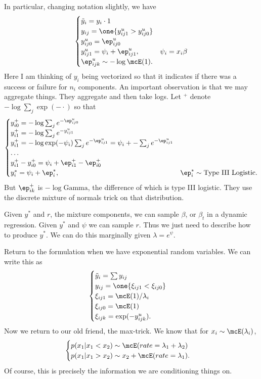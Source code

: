 \documentclass{article}
\begin{document}
In particular, changing notation slightly, we have
\[
\begin{cases}
\tilde y_i = y_i \cdot 1 \\
y_{ij} = \one \{ y_{ij1}^u > y_{ij0}^u \} \\
y_{ij0}^u = \ep_{ij0}^u \\
y_{ij1}^u = \psi_i + \ep_{ij1}^u, & \psi_i = x_i \beta \\
\ep_{ijk}^u \sim - \log \mcE(1).
\end{cases}
\]
Here I am thinking of $y_i$ being vectorized so that it indicates if there was a
success or failure for $n_i$ components.  An important observation is that we
may aggregate things.  They aggregate and then take logs.  Let $^+$ denote $-\log
\sum_j\exp(- \cdot)$ so that
\[
\begin{cases}
y_{i0}^+ = -\log \sum_{j} e^{-\ep_{ij0}^u} \\
y_{i1}^+ = -\log \sum_{j} e^{-y_{ij1}^u}\\
y_{i1}^+ = -\log \exp(-\psi_i) \sum_{j} e^{-\ep_{ij1}^u} = \psi_i + - \sum_{j}
e^{-\ep_{ij1}^u} \\
\ldots \\
y_{i1}^+ - y_{i0}^+ = \psi_i + \ep_{i1}^+ - \ep_{i0}^+ \\
y_{i}^* = \psi_i + \ep_i^*, & \ep_i^* \sim \text{Type III Logistic}.
\end{cases}
\]
But $\ep_{ik}^+$ is $- \log \text{Gamma}$, the difference of which is type III
logistic.  They use the discrete mixture of normals trick on that distribution.

Given $y^*$ and $r$, the mixture components, we can sample $\beta$, or $\beta_t$
in a dynamic regression.  Given $y^*$ and $\psi$ we can sample $r$.  Thus we
just need to describe how to produce $y^*$.  We can do this marginally given
$\lambda = e^\psi$.

Return to the formulation when we have exponential random variables.  We can
write this as
\[
\begin{cases}
\tilde y_i = \sum y_{ij} \\
y_{ij} = \one \{ \xi_{ij1} < \xi_{ij0} \} \\
\xi_{ij1} = \mcE(1) / \lambda_i \\
\xi_{ij0} = \mcE(1) \\
\xi_{ijk} = \exp (- y_{ijk}^u).
\end{cases}
\]
Now we return to our old friend, the max-trick.  We know that for $x_i \sim
\mcE(\lambda_i)$,
\[
\begin{cases}
p(x_1 | x_1 < x_2) \sim \mcE(rate = \lambda_1 + \lambda_2) \\
p(x_1 | x_1 > x_2) \sim x_2 + \mcE(rate = \lambda_1).
\end{cases}
\]
Of course, this is precisely the information we are conditioning things on.
\end{document}
